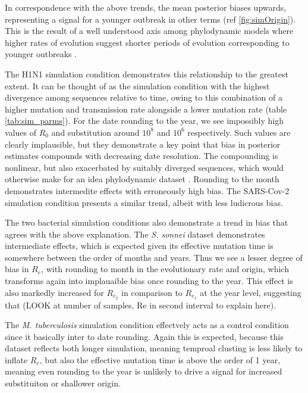 \documentclass{article}
\begin{document}
\begin{spacing}{1.5}
In correspondence with the above trends, the mean posterior biases upwards, representing a signal for a younger outbreak in other terms (ref \ref{fig:simOrigin}). This is the result of a well understood axis among phylodynamic models where higher rates of evolution suggest shorter periods of evolution corresponding to younger outbreaks \citep{featherstone_decoding_2023}.

The H1N1 simulation condition demonstrates this relationship to the greatest extent. It can be thought of as the simulation condition with the highest divergence among sequences relative to time, owing to this combination of a higher mutation and transmission rate alongside a lower mutation rate (table \ref{tab:sim_parms}). For the date rounding to the year, we see impossibly high values of $R_0$ and substitution around $10^{8}$ and $10^{6}$ respectively. Such values are clearly implausible, but they demonstrate a key point that bias in posterior estimates compounds with decreasing date resolution. The compounding is nonlinear, but also exacerbated by suitably diverged sequences, which would otherwise make for an idea phylodynamic dataset \citep{featherstone_decoding_2023}. Rounding to the month demonstrates intermedite effects with erroneously high bias. The SARS-Cov-2 simulation condition presents a similar trend, albeit with less ludicrous bias. 

The two bacterial simulation conditions also demonstrate a trend in bias that agrees with the above explanation. The \textit{S. sonnei} dataset demonstrates intermediate effects, which is expected given its effective mutation time is somewhere between the order of months and years. Thus we see a lesser degree of bias in $R_{e}$, with rounding to month in the evolutionary rate and origin, which transforms again into implauaible bias once rounding to the year. This effect is also markedly increased for $R_{e_2}$ in comparison to $R_{e_1}$ at the year level,  suggesting that (LOOK at number of samples, Re in second interval to explain here). 

The \textit{M. tuberculosis} simulation condition effectvely acts as a control condition since it basically inter to date rounding. Again this is expected, because this dataset reflects both longer simulation, meaning temproal clusting is less likely to inflate $R_e$, but also the effective mutation time is above the order of 1 year, meaning even rounding to the year is unlikely to drive a signal for increased substituiton or shallower origin.



\end{spacing}
\end{document}
